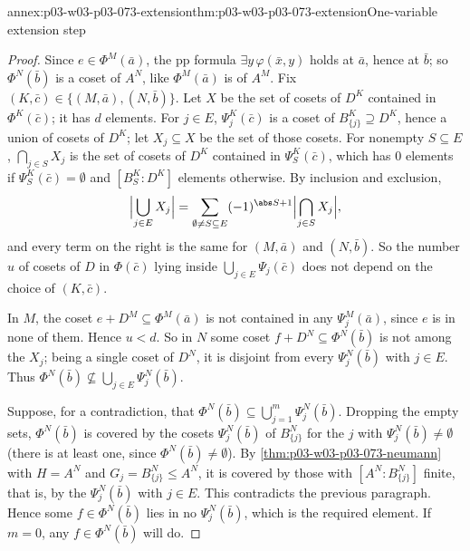 \begin{annexitem}{annex:p03-w03-p03-073-extension}{thm:p03-w03-p03-073-extension}{One-variable extension step}
\begin{proof}
Since \(e\in\Phi^M(\bar a)\), the pp formula \(\exists y\,\varphi(\bar x,y)\)
holds at \(\bar a\), hence at \(\bar b\); so \(\Phi^N(\bar b)\) is a coset
of \(A^N\), like \(\Phi^M(\bar a)\) is of \(A^M\). Fix
\((K,\bar c)\in\{(M,\bar a),(N,\bar b)\}\). Let \(X\) be the set of cosets
of \(D^K\) contained in \(\Phi^K(\bar c)\); it has \(d\) elements. For
\(j\in E\), \(\Psi_j^K(\bar c)\) is a coset of
\(B_{\{j\}}^K\supseteq D^K\), hence a union of cosets of \(D^K\); let
\(X_j\subseteq X\) be the set of those cosets. For nonempty
\(S\subseteq E\), \(\bigcap_{j\in S}X_j\) is the set of cosets of \(D^K\)
contained in \(\Psi_S^K(\bar c)\), which has \(0\) elements if
\(\Psi_S^K(\bar c)=\emptyset\) and \([B_S^K:D^K]\) elements otherwise. By
inclusion and exclusion,
\[
 \Bigl|\bigcup_{j\in E}X_j\Bigr|=\sum_{\emptyset\neq S\subseteq E}
 (-1)^{\abs S+1}\Bigl|\bigcap_{j\in S}X_j\Bigr|,
\]
and every term on the right is the same for \((M,\bar a)\) and
\((N,\bar b)\). So the number \(u\) of cosets of \(D\) in \(\Phi(\bar c)\)
lying inside \(\bigcup_{j\in E}\Psi_j(\bar c)\) does not depend on the
choice of \((K,\bar c)\).

In \(M\), the coset \(e+D^M\subseteq\Phi^M(\bar a)\) is not contained in any
\(\Psi_j^M(\bar a)\), since \(e\) is in none of them. Hence \(u<d\). So in
\(N\) some coset \(f+D^N\subseteq\Phi^N(\bar b)\) is not among the \(X_j\);
being a single coset of \(D^N\), it is disjoint from every
\(\Psi_j^N(\bar b)\) with \(j\in E\). Thus \(\Phi^N(\bar b)\not\subseteq
\bigcup_{j\in E}\Psi_j^N(\bar b)\).

Suppose, for a contradiction, that
\(\Phi^N(\bar b)\subseteq\bigcup_{j=1}^m\Psi_j^N(\bar b)\). Dropping the
empty sets, \(\Phi^N(\bar b)\) is covered by the cosets
\(\Psi_j^N(\bar b)\) of \(B_{\{j\}}^N\) for the \(j\) with
\(\Psi_j^N(\bar b)\neq\emptyset\) (there is at least one, since
\(\Phi^N(\bar b)\neq\emptyset\)). By \cref{thm:p03-w03-p03-073-neumann}
with \(H=A^N\) and \(G_j=B_{\{j\}}^N\le A^N\), it is covered by those with
\([A^N:B_{\{j\}}^N]\) finite, that is, by the \(\Psi_j^N(\bar b)\) with
\(j\in E\). This contradicts the previous paragraph. Hence some
\(f\in\Phi^N(\bar b)\) lies in no \(\Psi_j^N(\bar b)\), which is the
required element. If \(m=0\), any \(f\in\Phi^N(\bar b)\) will do.
\end{proof}
\end{annexitem}


